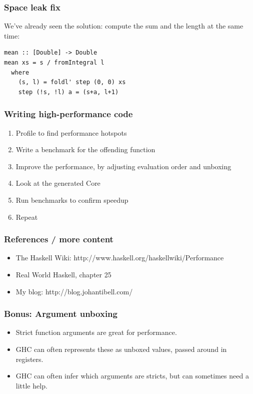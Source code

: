 \documentclass{beamer}
\begin{document}
\begin{frame}[fragile]
  \frametitle{Space leak fix}

  We've already seen the solution: compute the sum and the length at
  the same time:
  \begin{lstlisting}
mean :: [Double] -> Double
mean xs = s / fromIntegral l
  where
    (s, l) = foldl' step (0, 0) xs
    step (!s, !l) a = (s+a, l+1)
  \end{lstlisting}
\end{frame}

\begin{frame}
  \frametitle{Writing high-performance code}

  \begin{enumerate}
  \item Profile to find performance hotspots
  \item Write a benchmark for the offending function
  \item Improve the performance, by adjusting evaluation order and
    unboxing
  \item Look at the generated Core
  \item Run benchmarks to confirm speedup
  \item Repeat
  \end{enumerate}
\end{frame}

\begin{frame}
  \frametitle{References / more content}

  \begin{itemize}
  \item The Haskell Wiki:
    http://www.haskell.org/haskellwiki/Performance
  \item Real World Haskell, chapter 25
  \item My blog:
    http://blog.johantibell.com/
  \end{itemize}
\end{frame}

\begin{frame}
  \frametitle{Bonus: Argument unboxing}

  \begin{itemize}
  \item Strict function arguments are great for performance.
  \item GHC can often represents these as unboxed values, passed
    around in registers.
  \item GHC can often infer which arguments are stricts, but can
    sometimes need a little help.
  \end{itemize}
\end{frame}
\end{document}
